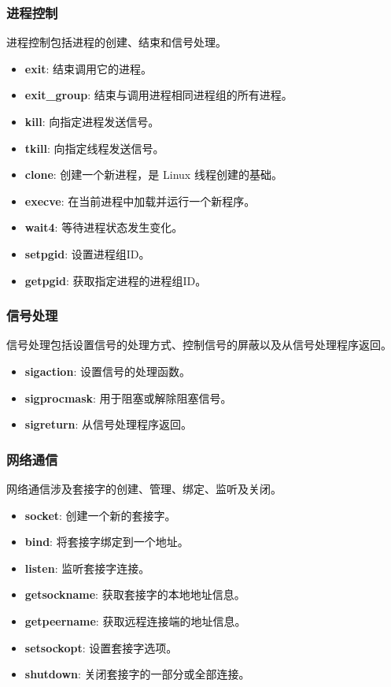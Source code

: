\subsubsection*{进程控制}
进程控制包括进程的创建、结束和信号处理。
\begin{itemize}
    \item \textbf{exit}: 结束调用它的进程。
    \item \textbf{exit\_group}: 结束与调用进程相同进程组的所有进程。
    \item \textbf{kill}: 向指定进程发送信号。
    \item \textbf{tkill}: 向指定线程发送信号。
    \item \textbf{clone}: 创建一个新进程，是 Linux 线程创建的基础。
    \item \textbf{execve}: 在当前进程中加载并运行一个新程序。
    \item \textbf{wait4}: 等待进程状态发生变化。
    \item \textbf{setpgid}: 设置进程组ID。
    \item \textbf{getpgid}: 获取指定进程的进程组ID。
\end{itemize}
\subsubsection{信号处理}
信号处理包括设置信号的处理方式、控制信号的屏蔽以及从信号处理程序返回。
\begin{itemize}
    \item \textbf{sigaction}: 设置信号的处理函数。
    \item \textbf{sigprocmask}: 用于阻塞或解除阻塞信号。
    \item \textbf{sigreturn}: 从信号处理程序返回。
\end{itemize}
\subsubsection{网络通信}
网络通信涉及套接字的创建、管理、绑定、监听及关闭。
\begin{itemize}
    \item \textbf{socket}: 创建一个新的套接字。
    \item \textbf{bind}: 将套接字绑定到一个地址。
    \item \textbf{listen}: 监听套接字连接。
    \item \textbf{getsockname}: 获取套接字的本地地址信息。
    \item \textbf{getpeername}: 获取远程连接端的地址信息。
    \item \textbf{setsockopt}: 设置套接字选项。
    \item \textbf{shutdown}: 关闭套接字的一部分或全部连接。
\end{itemize}
